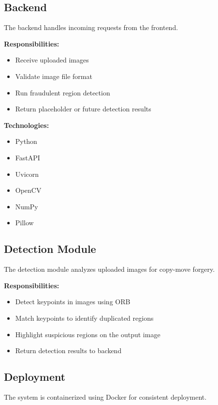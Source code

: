 \documentclass[12pt]{article}
\begin{document}
\subsection{Backend}

The backend handles incoming requests from the frontend.

\textbf{Responsibilities:}
\begin{itemize}[noitemsep]
    \item Receive uploaded images
    \item Validate image file format
    \item Run fraudulent region detection
    \item Return placeholder or future detection results
\end{itemize}

\textbf{Technologies:}
\begin{itemize}[noitemsep]
    \item Python
    \item FastAPI
    \item Uvicorn
    \item OpenCV
    \item NumPy
    \item Pillow
\end{itemize}

\subsection{Detection Module}

The detection module analyzes uploaded images for copy-move forgery.

\textbf{Responsibilities:}
\begin{itemize}[noitemsep]
    \item Detect keypoints in images using ORB
    \item Match keypoints to identify duplicated regions
    \item Highlight suspicious regions on the output image
    \item Return detection results to backend
\end{itemize}

\subsection{Deployment}

The system is containerized using Docker for consistent deployment.
\end{document}
